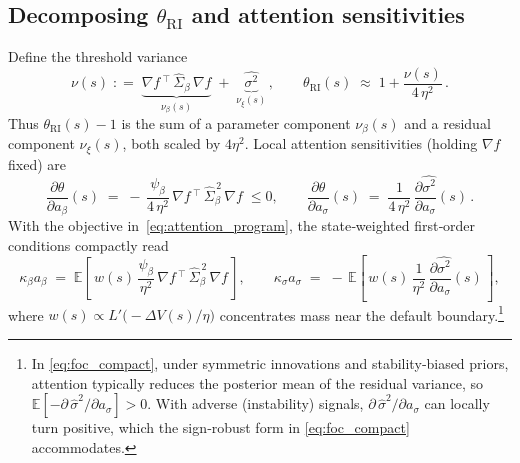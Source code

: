 \documentclass[12pt]{article}
\providecommand{\coloneqq}{\mathrel{\mathop:}=}
\theoremstyle{plain}
\newcommand{\E}{\mathbb{E}}
\begin{document}
\subsection{Decomposing \texorpdfstring{$\theta_{\mathrm{RI}}$}{theta-RI} and attention sensitivities}\label{sec:theta_decomp}
Define the threshold variance
\begin{equation}\label{eq:nu_def}
	\nu(s)\;\coloneqq\;\underbrace{\nabla f\,^{\!\top}\,\hat\Sigma_\beta\,\nabla f}_{\nu_\beta(s)}\;+\;\underbrace{\widehat{\sigma^2}}_{\nu_\xi(s)}\,,\qquad \theta_{\mathrm{RI}}(s)\;\approx\;1+\frac{\nu(s)}{4\,\eta^2}\,.
\end{equation}
Thus $\theta_{\mathrm{RI}}(s)-1$ is the sum of a parameter component $\nu_\beta(s)$ and a residual component $\nu_\xi(s)$, both scaled by $4\eta^2$. Local attention sensitivities (holding $\nabla f$ fixed) are
\begin{equation}\label{eq:theta_a_beta_sigma_short}
	\frac{\partial \theta}{\partial a_\beta}(s)\;=\;-\,\frac{\psi_\beta}{4\,\eta^2}\,\nabla f\,^{\!\top}\,\hat\Sigma_\beta^{\,2}\,\nabla f\;\le 0,\qquad
	\frac{\partial \theta}{\partial a_\sigma}(s)\;=\;\frac{1}{4\,\eta^2}\,\frac{\partial \widehat{\sigma^2}}{\partial a_\sigma}(s)\,.
\end{equation}
With the objective in~\eqref{eq:attention_program}, the state‑weighted first‑order conditions compactly read
\begin{equation}\label{eq:foc_compact}
	\kappa_\beta a_\beta\;=\;\E\left[\,w(s)\,\frac{\psi_\beta}{\eta^2}\,\nabla f\,^{\!\top}\,\hat\Sigma_\beta^{\,2}\,\nabla f\,\right],\qquad
	\kappa_\sigma a_\sigma\;=\;-\,\E\left[\,w(s)\,\frac{1}{\eta^2}\,\frac{\partial \widehat{\sigma^2}}{\partial a_\sigma}(s)\,\right],
\end{equation}
where $w(s)\propto L'\!\big(-\Delta V(s)/\eta\big)$ concentrates mass near the default boundary.\footnote{In \eqref{eq:foc_compact}, under symmetric innovations and stability‑biased priors, attention typically reduces the posterior mean of the residual variance, so $\E[-\partial \, \widehat{\sigma}^2/\partial a_\sigma]>0$. With adverse (instability) signals, $\partial \, \widehat{\sigma}^2/\partial a_\sigma$ can locally turn positive, which the sign‑robust form in \eqref{eq:foc_compact} accommodates.}
\end{document}
